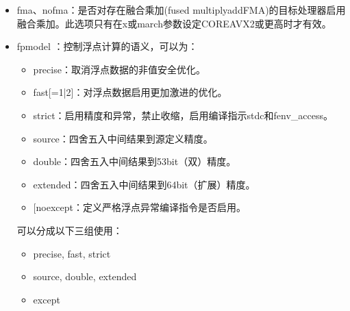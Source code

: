 \documentclass[a4paper,12pt,english]{sphinxmanual}
\begin{document}
\begin{itemize}
\begin{itemize}
\end{itemize}

\sphinxAtStartPar
{}为函数名列表，如： \sphinxhyphen{}fimf\sphinxhyphen{}precision=high:sin,sinf。

\item {} 
\sphinxAtStartPar
\sphinxhyphen{}fma、\sphinxhyphen{}no\sphinxhyphen{}fma：是否对存在融合乘加(fused multiply\sphinxhyphen{}add\sphinxhyphen{}FMA)的目标处理器启用融合乘加。此选项只有在\sphinxhyphen{}x或\sphinxhyphen{}march参数设定CORE\sphinxhyphen{}AVX2或更高时才有效。

\item {} 
\sphinxAtStartPar
\sphinxhyphen{}fp\sphinxhyphen{}model ：控制浮点计算的语义，可以为：
\begin{itemize}
\item {} 
\sphinxAtStartPar
precise：取消浮点数据的非值安全优化。

\item {} 
\sphinxAtStartPar
fast{[}=1|2{]}：对浮点数据启用更加激进的优化。

\item {} 
\sphinxAtStartPar
strict：启用精度和异常，禁止收缩，启用编译指示stdc和fenv\_access。

\item {} 
\sphinxAtStartPar
source：四舍五入中间结果到源定义精度。

\item {} 
\sphinxAtStartPar
double：四舍五入中间结果到53\sphinxhyphen{}bit（双）精度。

\item {} 
\sphinxAtStartPar
extended：四舍五入中间结果到64\sphinxhyphen{}bit（扩展）精度。

\item {} 
\sphinxAtStartPar
{[}no\sphinxhyphen{}{]}except：定义严格浮点异常编译指令是否启用。

\end{itemize}

\sphinxAtStartPar
{}可以分成以下三组使用：
\begin{itemize}
\item {} 
\sphinxAtStartPar
precise, fast, strict

\item {} 
\sphinxAtStartPar
source, double, extended

\item {} 
\sphinxAtStartPar
except


\end{itemize}
\end{itemize}
\end{document}
